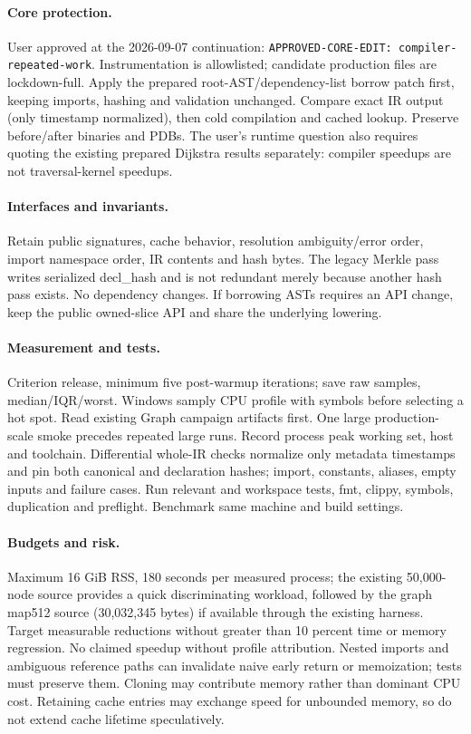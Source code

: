 \documentclass[11pt,a4paper]{article}
\begin{document}
\paragraph{Core protection.} User approved at the 2026-09-07 continuation:
\texttt{APPROVED-CORE-EDIT: compiler-repeated-work}.
Instrumentation is allowlisted; candidate production files are lockdown-full.
Apply the prepared root-AST/dependency-list borrow patch first, keeping imports,
hashing and validation unchanged. Compare exact IR output (only timestamp normalized),
then cold compilation and cached lookup. Preserve before/after binaries and PDBs.
The user's runtime question also requires quoting the existing prepared Dijkstra
results separately: compiler speedups are not traversal-kernel speedups.
\paragraph{Interfaces and invariants.} Retain public signatures, cache behavior,
resolution ambiguity/error order, import namespace order, IR contents and hash bytes.
The legacy Merkle pass writes serialized decl\_hash and is not redundant merely
because another hash pass exists. No dependency changes. If borrowing ASTs requires
an API change, keep the public owned-slice API and share the underlying lowering.
\paragraph{Measurement and tests.} Criterion release, minimum five post-warmup
iterations; save raw samples, median/IQR/worst. Windows samply CPU profile with
symbols before selecting a hot spot. Read existing Graph campaign artifacts first.
One large production-scale smoke precedes repeated large runs. Record process peak
working set, host and toolchain. Differential whole-IR checks normalize only metadata
timestamps and pin both canonical and declaration hashes; import, constants, aliases,
empty inputs and failure cases. Run relevant and workspace tests, fmt, clippy,
symbols, duplication and preflight. Benchmark same machine and build settings.
\paragraph{Budgets and risk.} Maximum 16 GiB RSS, 180 seconds per measured process;
the existing 50,000-node source provides a quick discriminating workload, followed by
the graph map512 source (30,032,345 bytes) if available through the existing harness.
Target measurable reductions without greater than 10 percent time or memory regression.
No claimed speedup without profile attribution. Nested imports and ambiguous reference
paths can invalidate naive early return or memoization; tests must preserve them.
Cloning may contribute memory rather than dominant CPU cost. Retaining cache entries
may exchange speed for unbounded memory, so do not extend cache lifetime speculatively.
\end{document}
